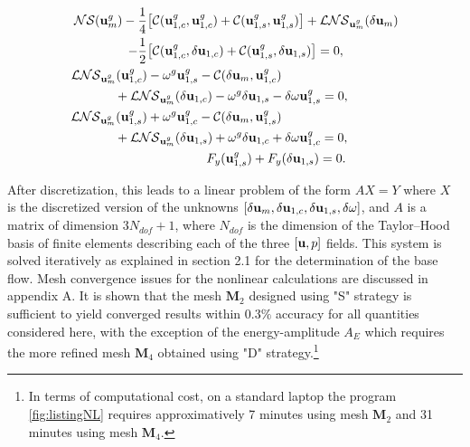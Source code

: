 \documentclass[twocolumn,10pt]{asme2ej}
\begin{document}
\begin{subequations}

\begin{align}
{\cal NS}(  {\bf u }_m^g ) - \frac{1}{4} &\big[ {\cal C}( {\bf u }_{1,c}^g,{\bf u }_{1,c}^g) +  {\cal C}( {\bf u }_{1,s}^g,{\bf u }_{1,s}^g) \big]+ {\cal LNS}_{{\bf u }_m^g}(\delta {\bf u }_m) \nonumber \\
-\frac{1}{2}& \big[ {\cal C}( {\bf u }_{1,c}^g,\delta {\bf u }_{1,c}) +  {\cal C}( {\bf u }_{1,s}^g,\delta {\bf u }_{1,s}) \big] = 0, \label{HB_1} \\
{\cal LNS}_{{\bf u }_m^g}( {\bf u }_{1,c}^g)& - \omega^g {\bf u }_{1,s}^g -  {\cal C}( \delta {\bf u }_{m}, {\bf u }_{1,c}^g) \nonumber \\
&\hspace{-0.9cm}+{\cal LNS}_{{\bf u }_m^g}( \delta {\bf u }_{1,c})  - \omega^g \delta {\bf u }_{1,s}  
 - \delta \omega {\bf u }_{1,s}^g = 0 , \label{HB_2}\\
{\cal LNS}_{{\bf u }_m^g}({\bf u }_{1,s}^g)& + \omega^g {\bf u }_{1,c}^g -  {\cal C}( \delta {\bf u }_{m}, {\bf u }_{1,s}^g) \nonumber \\
&\hspace{-0.9cm}+{\cal LNS}_{{\bf u }_m^g}( \delta {\bf u }_{1,s}) + \omega^g \delta {\bf u }_{1,c} +  \delta \omega {\bf u }_{1,c}^g= 0 , \label{HB_3} \\
&\hspace{1.65cm} F_y({\bf u }_{1,s}^g) + F_y(\delta {\bf u }_{1,s}) = 0. 
\end{align}
\end{subequations}

After discretization, this leads to a linear problem of the form $A X = Y$ where $X$ is the discretized version of the unknowns  $[\delta {\bf u }_m, \delta {\bf u }_{1,c}, \delta {\bf u }_{1,s}, \delta \omega]$, and $A$ is a matrix of dimension $3 N_{dof} +1$, where $N_{dof}$ is the dimension of the Taylor--Hood basis of finite elements describing each of the three $[{\bf u},p]$ fields. This system is solved iteratively as explained in section 2.1 for the determination of the base flow. %
Mesh convergence issues for the nonlinear calculations are discussed in appendix A. It is shown that the mesh $\mathbf{M}_2$ designed using "S" strategy is sufficient to yield converged results within $0.3\%$ accuracy for all quantities considered here, with the exception of the energy-amplitude $A_E$ which requires the more refined mesh $\mathbf{M}_4$ obtained using "D" strategy.\footnote{In terms of computational cost, on a standard laptop the program  \ref{fig:listingNL} requires approximatively 7 minutes using  mesh $\mathbf{M}_2$ and 31 minutes using mesh $\mathbf{M}_4$.} 
 
\end{document}
